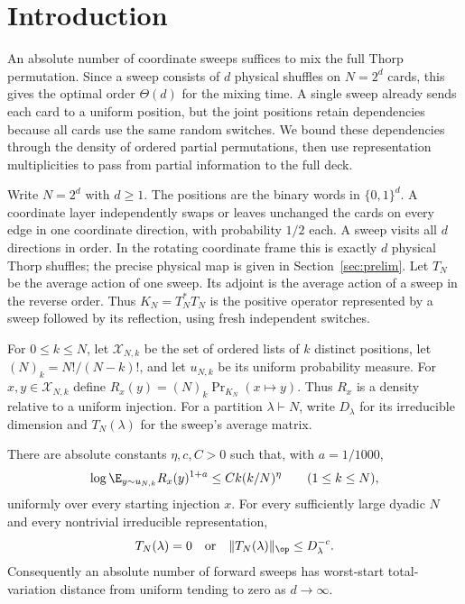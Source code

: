 \section{Introduction}\label{sec:introduction}
An absolute number of coordinate sweeps suffices to mix the full Thorp
permutation. Since a sweep consists of $d$ physical shuffles on $N=2^d$
cards, this gives the optimal order $\Theta(d)$ for the mixing time.
A single sweep already sends each card to a uniform position, but the
joint positions retain dependencies because all cards use the same
random switches. We bound these dependencies through the density of
ordered partial permutations, then use representation multiplicities
to pass from partial information to the full deck.

Write $N=2^d$ with $d\ge1$. The positions are the binary words in $\{0,1\}^d$.
A coordinate layer independently swaps or leaves unchanged the cards on
every edge in one coordinate direction, with probability $1/2$ each.
A sweep visits all $d$ directions in order. In the rotating coordinate
frame this is exactly $d$ physical Thorp shuffles; the precise physical
map is given in Section~\ref{sec:prelim}.
Let $T_N$ be the average action of one sweep. Its adjoint is the average
action of a sweep in the reverse order. Thus $K_N=T_N^*T_N$ is the
positive operator represented by a sweep followed by its reflection,
using fresh independent switches.

For $0\le k\le N$, let $\mathcal X_{N,k}$ be the set of ordered lists of
$k$ distinct positions, let $(N)_k=N!/(N-k)!$, and let $u_{N,k}$ be its
uniform probability measure. For $x,y\in\mathcal X_{N,k}$ define
$R_x(y)=(N)_k\Pr_{K_N}(x\mapsto y)$.
Thus $R_x$ is a density relative to a uniform injection. For a partition
$\lambda\vdash N$, write $D_\lambda$ for its irreducible dimension and
$T_N(\lambda)$ for the sweep's average matrix.

\begin{theorem}\label{fac:main}
There are absolute constants $\eta,c,C>0$ such that, with $a=1/1000$,
\[
 \log\E_{y\sim u_{N,k}}R_x(y)^{1+a}
 \le Ck(k/N)^\eta
 \qquad(1\le k\le N),
\]
uniformly over every starting injection $x$. For every sufficiently
large dyadic $N$ and every nontrivial irreducible representation,
\[
 T_N(\lambda)=0\quad\hbox{or}\quad
 \|T_N(\lambda)\|_{\op}\le D_\lambda^{-c}.
\]
Consequently an absolute number of forward sweeps has worst-start
total-variation distance from uniform tending to zero as $d\to\infty$.
\end{theorem}

